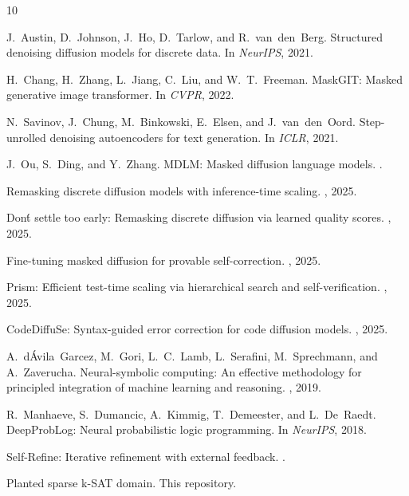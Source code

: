 \documentclass[11pt,a4paper,twoside]{article}
\theoremstyle{definition}
\begin{document}

\begin{thebibliography}{10}

J.~Austin, D.~Johnson, J.~Ho, D.~Tarlow, and R.~van~den~Berg.
\newblock Structured denoising diffusion models for discrete data.
\newblock In {\em NeurIPS}, 2021.

H.~Chang, H.~Zhang, L.~Jiang, C.~Liu, and W.~T.~Freeman.
\newblock MaskGIT: Masked generative image transformer.
\newblock In {\em CVPR}, 2022.

N.~Savinov, J.~Chung, M.~Binkowski, E.~Elsen, and J.~van~den~Oord.
\newblock Step-unrolled denoising autoencoders for text generation.
\newblock In {\em ICLR}, 2021.

J.~Ou, S.~Ding, and Y.~Zhang.
\newblock MDLM: Masked diffusion language models.
.

\newblock Remasking discrete diffusion models with inference-time scaling.
, 2025.

\newblock Don\'t settle too early: Remasking discrete diffusion via learned quality scores.
, 2025.

\newblock Fine-tuning masked diffusion for provable self-correction.
, 2025.

\newblock Prism: Efficient test-time scaling via hierarchical search and self-verification.
, 2025.

\newblock CodeDiffuSe: Syntax-guided error correction for code diffusion models.
, 2025.

A.~d\'Avila~Garcez, M.~Gori, L.~C.~Lamb, L.~Serafini, M.~Sprechmann, and A.~Zaverucha.
\newblock Neural-symbolic computing: An effective methodology for principled integration of machine learning and reasoning.
, 2019.

R.~Manhaeve, S.~Dumancic, A.~Kimmig, T.~Demeester, and L.~De~Raedt.
\newblock DeepProbLog: Neural probabilistic logic programming.
\newblock In {\em NeurIPS}, 2018.

\newblock Self-Refine: Iterative refinement with external feedback.
.

\newblock Planted sparse k-SAT domain.
\newblock This repository.

\end{thebibliography}
\end{document}
